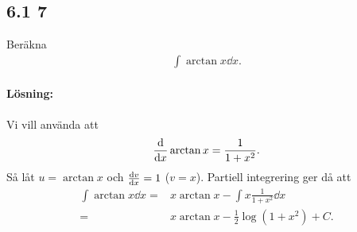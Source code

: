 \subsection{6.1 7}%
\label{sub:6_1_7}

Beräkna
\begin{align*}
	\int \arctan x \dd{x}.
\end{align*}

\paragraph{Lösning:}

Vi vill använda att
\begin{align*}
	\derivative{}{x} \arctan{x} = \frac{1}{1 + x^2}.
\end{align*}
Så låt $u = \arctan{x}$ och $\derivative{v}{x} = 1$ ($v = x$).
Partiell integrering ger då att
\begin{align*}
	\int \arctan x \dd{x} ={}& x \arctan{x} - \int x \frac{1}{1 + x^2} \dd{x}\\
	={}& x \arctan{x} - \frac{1}{2} \log{(1 + x^2)} + C.
\end{align*}

